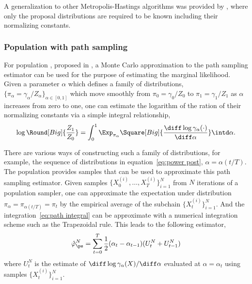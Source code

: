 A generalization to other Metropolis-Hastings algorithms was
provided by \cite{Chib:2001gq}, where only the proposal distributions are
required to be known including their normalizing constants.

\subsubsection{Population \mcmc with path sampling}
\label{ssub:Population mcmc with path sampling}

For population \mcmc, proposed in \cite{Calderhead:2009bd}, a Monte Carlo
approximation to the path sampling estimator \cite{Gelman:1998ei} can be used
for the purpose of estimating the marginal likelihood. Given a parameter
$\alpha$ which defines a family of distributions, $\{\pi_{\alpha} =
\gamma_{\alpha}/Z_{\alpha}\}_{\alpha\in[0,1]}$ which move smoothly from $\pi_0
= \gamma_0/Z_0$ to $\pi_1 = \gamma_1/Z_1$ as $\alpha$ increases from zero to
one, one can estimate the logarithm of the ration of their normalizing
constants via a simple integral relationship,
\begin{equation}
  \log\Round[Big]{\frac{Z_1}{Z_0}} = \int_0^1\Exp_{\pi_{\alpha}}
  \Square[Big]{\frac{\diff\log\gamma_{\alpha}(\cdot)}{\diff\alpha}}
  \intd\alpha.
  \label{eq:path integral}
\end{equation}

There are various ways of constructing such a family of distributions, for
example, the sequence of distributions in equation~\eqref{eq:power post},
$\alpha = \alpha(t/T)$. The population \mcmc provides samples that can be used
to approximate this path sampling estimator. Given samples
$\{X_0^{(i)},\dots,X_T^{(i)}\}_{i=1}^N$ from $N$ iterations of a population
\mcmc sampler, one can approximate the expectation under distribution
$\pi_{\alpha} = \pi_{\alpha(t/T)} = \pi_t$ by the empirical average of the
subchain $\{X_t^{(i)}\}_{i=1}^N$. And the integration~\eqref{eq:path integral}
can be approximate with a numerical integration scheme such as the Trapezoidal
rule. This leads to the following estimator,
\begin{equation}
  \hat\varphi_{\ps}^N = \sum_{t=0}^T
  \frac{1}{2}(\alpha_t - \alpha_{t-1})(U_t^N + U_{t-1}^N)
\end{equation}
where $U_t^N$ is the estimate of
$\diff\log\gamma_{\alpha}(X)/\diff\alpha$ evaluated at $\alpha = \alpha_t$
using samples $\{X_t^{(i)}\}_{i=1}^N$.

